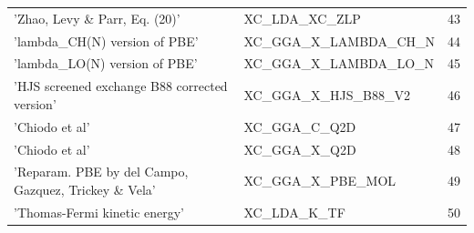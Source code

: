 \documentclass[final,12pt,makeidx,DIV=calc]{article}
\begin{document}
{{{\begin{table}[!h]
\begin{center}
\begin{tabular}{llr}
  'Zhao, Levy \& Parr, Eq. (20)' & XC\_LDA\_XC\_ZLP  & 43\\
  'lambda\_CH(N) version of PBE' & XC\_GGA\_X\_LAMBDA\_CH\_N  & 44\\
  'lambda\_LO(N) version of PBE' & XC\_GGA\_X\_LAMBDA\_LO\_N  & 45\\
  'HJS screened exchange B88 corrected version' & XC\_GGA\_X\_HJS\_B88\_V2  & 46\\
  'Chiodo et al' & XC\_GGA\_C\_Q2D  & 47\\
  'Chiodo et al' & XC\_GGA\_X\_Q2D  & 48\\
  'Reparam. PBE by del Campo, Gazquez, Trickey \& Vela' & XC\_GGA\_X\_PBE\_MOL  & 49\\
  'Thomas-Fermi kinetic energy' & XC\_LDA\_K\_TF  & 50\\
\hline
\hline
\end{tabular}
\end{center}
\end{table}

}}}
\end{document}
